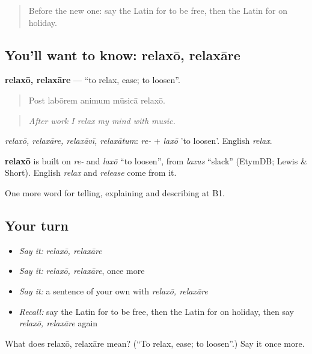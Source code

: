 \begin{quote}
Before the new one: say the Latin for to be free, then the Latin for on holiday.
\end{quote}

\subsection*{You'll want to know: relaxō, relaxāre}
\textbf{relaxō, relaxāre} — \textquotedblleft{}to relax, ease; to loosen\textquotedblright{}.

\begin{quote}
Post labōrem animum mūsicā relaxō.
\end{quote}

\begin{quote}
\emph{After work I relax my mind with music.}
\end{quote}

\emph{relaxō, relaxāre, relaxāvī, relaxātum}: \emph{re-} + \emph{laxō} 'to loosen'. English \emph{relax}.

\begin{cousinweb}
\textbf{relaxō} is built on \emph{re-} and \emph{laxō} \textquotedblleft{}to loosen\textquotedblright{}, from \emph{laxus} \textquotedblleft{}slack\textquotedblright{} (EtymDB; Lewis \& Short). English \emph{relax} and \emph{release} come from it.
\end{cousinweb}

\begin{grammarlens}[title={What you've built}]
One more word for telling, explaining and describing at B1.
\end{grammarlens}

\subsection*{Your turn}
\begin{itemize}
\raggedright
  \item \emph{Say it:} \emph{relaxō, relaxāre}
  \item \emph{Say it:} \emph{relaxō, relaxāre}, once more
  \item \emph{Say it:} a sentence of your own with \emph{relaxō, relaxāre}
  \item \emph{Recall:} say the Latin for to be free, then the Latin for on holiday, then say \emph{relaxō, relaxāre} again
\end{itemize}

\begin{tcolorbox}[breakable,colback=teal!4,colframe=teal!35!black,title={Before you move on}]
What does relaxō, relaxāre mean? (\textquotedblleft{}To relax, ease; to loosen\textquotedblright{}.) Say it once more.
\end{tcolorbox}
